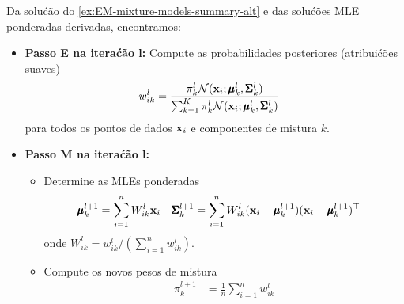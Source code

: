\begin{exenumerate}
    \begin{solution}
        Da solu\'c\~ao do \ref{ex:EM-mixture-models-summary-alt} e das solu\'c\~oes MLE ponderadas
        derivadas, encontramos:
        \begin{itemize}
            \item \textbf{Passo E na itera\'c\~ao l:} Compute as probabilidades posteriores (atribui\'c\~oes suaves)
            \begin{align}
                w_{ik}^l & =  \frac{ \pi^l_k \mathcal{N}(\mathbf{x}_i; \pmb{\mu}^l_k, \pmb{\Sigma}_k^l)}{ \sum_{k=1}^K \pi^l_k \mathcal{N}(\mathbf{x}_i; \pmb{\mu}^l_k, \pmb{\Sigma}_k^l) } 
            \end{align}
            para todos os pontos de dados $\mathbf{x}_i$ e componentes de mistura $k$.
            \item  \textbf{Passo M na itera\'c\~ao l:}
            \begin{itemize}
                \item Determine as MLEs ponderadas
                \begin{align}
                    \pmb{\mu}_k^{l+1} & =   \sum_{i=1}^n W^l_{ik}\mathbf{x}_i&  \pmb{\Sigma}_k^{l+1} &=    \sum_{i=1}^n W^l_{ik} (\mathbf{x}_i - \pmb{\mu}_k^{l+1})(\mathbf{x}_i - \pmb{\mu}_k^{l+1})^\top
                \end{align}
                onde $W^l_{ik} = w_{ik}^l/(\sum_{i=1}^n w_{ik}^l)$.
                \item Compute os novos pesos de mistura
                \begin{align}
                    \pi_k^{l+1} &=  \frac{1}{n}\sum_{i=1}^n w_{ik}^l
                \end{align}
            \end{itemize}
        \end{itemize}
        
    \end{solution}
    
\end{exenumerate}